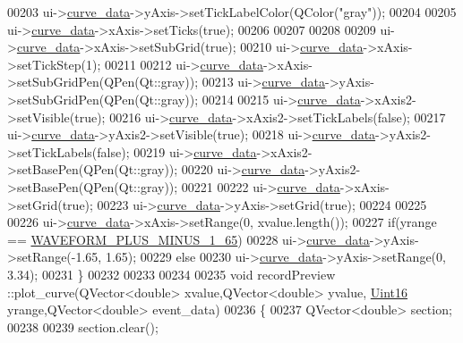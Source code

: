 \begin{DoxyCode}
00203   ui->\hyperlink{a00081_a247d94481323c0bc4f8b6458a8a535dd}{curve\_data}->yAxis->setTickLabelColor(QColor(\textcolor{stringliteral}{"gray"}));
00204 
00205   ui->\hyperlink{a00081_a247d94481323c0bc4f8b6458a8a535dd}{curve\_data}->xAxis->setTicks(\textcolor{keyword}{true});
00206 
00207 
00208 
00209   ui->\hyperlink{a00081_a247d94481323c0bc4f8b6458a8a535dd}{curve\_data}->xAxis->setSubGrid(\textcolor{keyword}{true});
00210   ui->\hyperlink{a00081_a247d94481323c0bc4f8b6458a8a535dd}{curve\_data}->xAxis->setTickStep(1);
00211 
00212   ui->\hyperlink{a00081_a247d94481323c0bc4f8b6458a8a535dd}{curve\_data}->xAxis->setSubGridPen(QPen(Qt::gray));
00213   ui->\hyperlink{a00081_a247d94481323c0bc4f8b6458a8a535dd}{curve\_data}->yAxis->setSubGridPen(QPen(Qt::gray));
00214 
00215   ui->\hyperlink{a00081_a247d94481323c0bc4f8b6458a8a535dd}{curve\_data}->xAxis2->setVisible(\textcolor{keyword}{true});
00216   ui->\hyperlink{a00081_a247d94481323c0bc4f8b6458a8a535dd}{curve\_data}->xAxis2->setTickLabels(\textcolor{keyword}{false});
00217   ui->\hyperlink{a00081_a247d94481323c0bc4f8b6458a8a535dd}{curve\_data}->yAxis2->setVisible(\textcolor{keyword}{true});
00218   ui->\hyperlink{a00081_a247d94481323c0bc4f8b6458a8a535dd}{curve\_data}->yAxis2->setTickLabels(\textcolor{keyword}{false});
00219   ui->\hyperlink{a00081_a247d94481323c0bc4f8b6458a8a535dd}{curve\_data}->xAxis2->setBasePen(QPen(Qt::gray));
00220   ui->\hyperlink{a00081_a247d94481323c0bc4f8b6458a8a535dd}{curve\_data}->yAxis2->setBasePen(QPen(Qt::gray));
00221 
00222    ui->\hyperlink{a00081_a247d94481323c0bc4f8b6458a8a535dd}{curve\_data}->xAxis->setGrid(\textcolor{keyword}{true});
00223    ui->\hyperlink{a00081_a247d94481323c0bc4f8b6458a8a535dd}{curve\_data}->yAxis->setGrid(\textcolor{keyword}{true});
00224 
00225 
00226   ui->\hyperlink{a00081_a247d94481323c0bc4f8b6458a8a535dd}{curve\_data}->xAxis->setRange(0, xvalue.length());
00227   \textcolor{keywordflow}{if}(yrange == \hyperlink{a00090_a0923d3b365a36e1e8c401cec964aa36f}{WAVEFORM\_PLUS\_MINUS\_1\_65})
00228   ui->\hyperlink{a00081_a247d94481323c0bc4f8b6458a8a535dd}{curve\_data}->yAxis->setRange(-1.65, 1.65);
00229   \textcolor{keywordflow}{else}
00230   ui->\hyperlink{a00081_a247d94481323c0bc4f8b6458a8a535dd}{curve\_data}->yAxis->setRange(0, 3.34);
00231 \}
00232 
00233 
00234 
00235 \textcolor{keywordtype}{void} recordPreview ::plot\_curve(QVector<double> xvalue,QVector<double> yvalue, 
      \hyperlink{a00004_aae7407b021d43f7193a81a58cfb3e297}{Uint16} yrange,QVector<double> event\_data)
00236 \{
00237     QVector<double> section;
00238 
00239     section.clear();

\end{DoxyCode}

